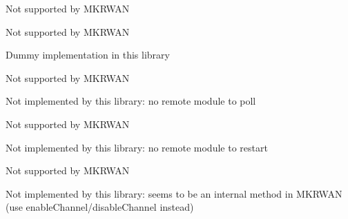 \begin{DoxyRefList}
 Not supported by M\+K\+R\+W\+AN  
\item[Member \mbox{\hyperlink{classSTM32LoRaWAN_afd305ad1b2327c96fd1bd94c41c6fb46}{S\+T\+M32\+Lo\+Ra\+W\+AN::maintain\+Until\+Idle}} ()]\label{extensions__extensions000021}%
%
 Not supported by M\+K\+R\+W\+AN  
\item[Member \mbox{\hyperlink{classSTM32LoRaWAN_ad98e9a94a0a991742a433ce1dd67ec84}{S\+T\+M32\+Lo\+Ra\+W\+AN::min\+Poll\+Interval}} (unsigned long)]\label{extensions__extensions000024}%
%
 Dummy implementation in this library  
\item[Member \mbox{\hyperlink{classSTM32LoRaWAN_a14df7748a2df407809fa2862da7194be}{S\+T\+M32\+Lo\+Ra\+W\+AN::modify\+Channel\+Enabled}} (unsigned pos, bool value)]\label{extensions__extensions000014}%
%
 Not supported by M\+K\+R\+W\+AN  
\item[Member \mbox{\hyperlink{classSTM32LoRaWAN_a79634164ef1e9c2d8c4d4589cbeaf665}{S\+T\+M32\+Lo\+Ra\+W\+AN::poll}} ()]\label{extensions__extensions000035}%
%
 Not implemented by this library\+: no remote module to poll  
\item[Member \mbox{\hyperlink{classSTM32LoRaWAN_ac720f4ea2f3efe054908a8f8bdcfc7a5}{S\+T\+M32\+Lo\+Ra\+W\+AN::powerdB}} (int8\+\_\+t db)]\label{extensions__extensions000012}%
%
 Not supported by M\+K\+R\+W\+AN  
\item[Member \mbox{\hyperlink{classSTM32LoRaWAN_a8a715c4ec0ba3a9601a229a8c43d05be}{S\+T\+M32\+Lo\+Ra\+W\+AN::restart}} ()]\label{extensions__extensions000034}%
%
 Not implemented by this library\+: no remote module to restart  
\item[Member \mbox{\hyperlink{classSTM32LoRaWAN_acd434a7ebbe91a548c010355f7553460}{S\+T\+M32\+Lo\+Ra\+W\+AN::send}} (const uint8\+\_\+t $\ast$payload, size\+\_\+t size, bool confirmed)]\label{extensions__extensions000019}%
%
 Not supported by M\+K\+R\+W\+AN  
\item[Member \mbox{\hyperlink{classSTM32LoRaWAN_af21b1d27c22c2e94da4ca2d368620c13}{S\+T\+M32\+Lo\+Ra\+W\+AN::send\+Mask}} (String new\+Mask)]\label{extensions__extensions000045}%
%
 Not implemented by this library\+: seems to be an internal method in M\+K\+R\+W\+AN (use enable\+Channel/disable\+Channel instead)  

\end{DoxyRefList}
